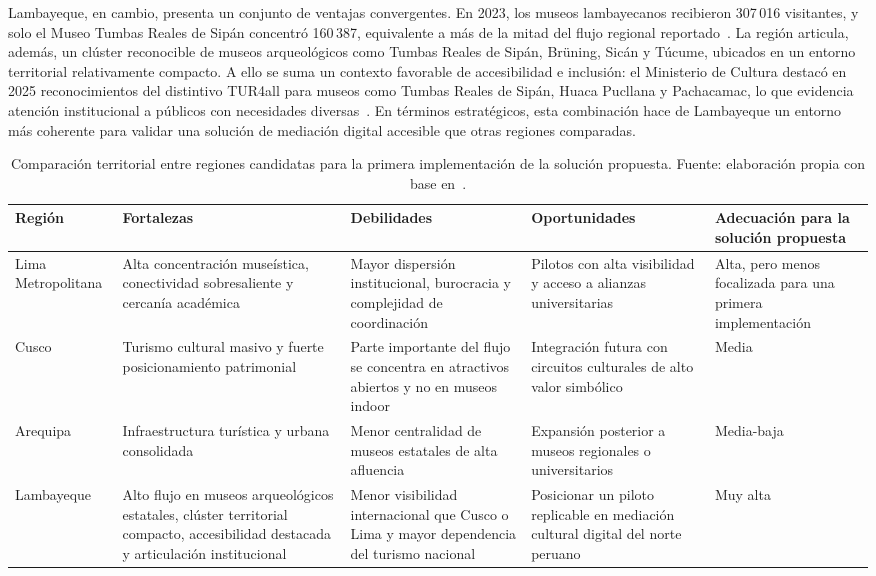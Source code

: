 Lambayeque, en cambio, presenta un conjunto de ventajas convergentes. En 2023, los museos lambayecanos recibieron 307\,016 visitantes, y solo el Museo Tumbas Reales de Sipán concentró 160\,387, equivalente a más de la mitad del flujo regional reportado~\cite{naylamp2023visitantes}. La región articula, además, un clúster reconocible de museos arqueológicos como Tumbas Reales de Sipán, Brüning, Sicán y Túcume, ubicados en un entorno territorial relativamente compacto. A ello se suma un contexto favorable de accesibilidad e inclusión: el Ministerio de Cultura destacó en 2025 reconocimientos del distintivo TUR4all para museos como Tumbas Reales de Sipán, Huaca Pucllana y Pachacamac, lo que evidencia atención institucional a públicos con necesidades diversas~\cite{cultura2025tur4all}. En términos estratégicos, esta combinación hace de Lambayeque un entorno más coherente para validar una solución de mediación digital accesible que otras regiones comparadas.

\begin{table}[h!]
	\centering
	\scriptsize
	\setlength{\tabcolsep}{3pt}
	\begin{tabular}{>{\raggedright\arraybackslash}p{2.2cm} >{\raggedright\arraybackslash}p{2.9cm} >{\raggedright\arraybackslash}p{2.7cm} >{\raggedright\arraybackslash}p{2.7cm} >{\raggedright\arraybackslash}p{2.6cm}}
		\hline
		\textbf{Región} & \textbf{Fortalezas} & \textbf{Debilidades} & \textbf{Oportunidades} & \textbf{Adecuación para la solución propuesta} \\
		\hline
		Lima Metropolitana & Alta concentración museística, conectividad sobresaliente y cercanía académica & Mayor dispersión institucional, burocracia y complejidad de coordinación & Pilotos con alta visibilidad y acceso a alianzas universitarias & Alta, pero menos focalizada para una primera implementación \\
		Cusco & Turismo cultural masivo y fuerte posicionamiento patrimonial & Parte importante del flujo se concentra en atractivos abiertos y no en museos indoor & Integración futura con circuitos culturales de alto valor simbólico & Media \\
		Arequipa & Infraestructura turística y urbana consolidada & Menor centralidad de museos estatales de alta afluencia & Expansión posterior a museos regionales o universitarios & Media-baja \\
		Lambayeque & Alto flujo en museos arqueológicos estatales, clúster territorial compacto, accesibilidad destacada y articulación institucional & Menor visibilidad internacional que Cusco o Lima y mayor dependencia del turismo nacional & Posicionar un piloto replicable en mediación cultural digital del norte peruano & Muy alta \\
		\hline
	\end{tabular}
	\caption[Comparación territorial para la primera implementación de la solución propuesta]{Comparación territorial entre regiones candidatas para la primera implementación de la solución propuesta. Fuente: elaboración propia con base en~\cite{infocultura2023visitantes,naylamp2023visitantes,mincetur2023cusco,osiptel2024smartphone,cultura2025tur4all}.}
\end{table}

